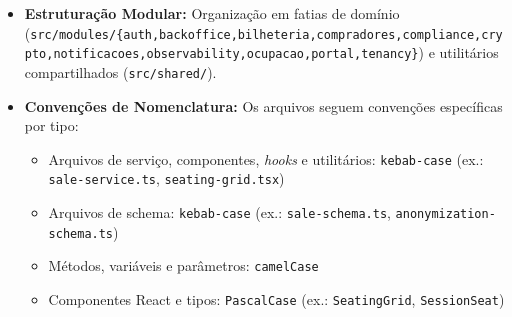\begin{itemize}
\item \textbf{Estruturação Modular:} Organização em fatias de domínio (\texttt{src/\allowbreak\hspace{0pt plus 1pt}modules/\allowbreak\hspace{0pt plus 1pt}\{auth,\allowbreak\hspace{0pt plus 1pt}backoffice,\allowbreak\hspace{0pt plus 1pt}bilheteria,\allowbreak\hspace{0pt plus 1pt}compradores,\allowbreak\hspace{0pt plus 1pt}compliance,\allowbreak\hspace{0pt plus 1pt}crypto,\allowbreak\hspace{0pt plus 1pt}notificacoes,\allowbreak\hspace{0pt plus 1pt}observability,\allowbreak\hspace{0pt plus 1pt}ocupacao,\allowbreak\hspace{0pt plus 1pt}portal,\allowbreak\hspace{0pt plus 1pt}tenancy\}}) e utilitários compartilhados (\texttt{src/\allowbreak\hspace{0pt plus 1pt}shared/}).
\item \textbf{Convenções de Nomenclatura:} Os arquivos seguem convenções específicas por tipo:
\begin{itemize}
\item Arquivos de serviço, componentes, \emph{hooks} e utilitários: \texttt{kebab-case} (ex.: \texttt{sale-\allowbreak\hspace{0pt plus 1pt}service.\allowbreak\hspace{0pt plus 1pt}ts}, \texttt{seating-\allowbreak\hspace{0pt plus 1pt}grid.\allowbreak\hspace{0pt plus 1pt}tsx})
\item Arquivos de schema: \texttt{kebab-case} (ex.: \texttt{sale-\allowbreak\hspace{0pt plus 1pt}schema.\allowbreak\hspace{0pt plus 1pt}ts}, \texttt{anonymization-\allowbreak\hspace{0pt plus 1pt}schema.\allowbreak\hspace{0pt plus 1pt}ts})
\item Métodos, variáveis e parâmetros: \texttt{camelCase}
\item Componentes React e tipos: \texttt{PascalCase} (ex.: \texttt{SeatingGrid}, \texttt{SessionSeat})

\end{itemize}
\end{itemize}
